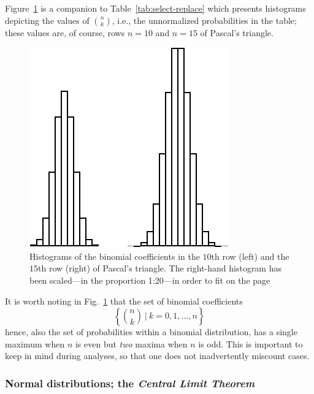 Figure~\ref{fig:gaussiandistribution} is a companion to Table~\ref{tab:select-replace} which presents histograms depicting the values of $\displaystyle {n \choose k}$, i.e., the unnormalized probabilities in the table; these values are, of course, rows $n =10$ and $n=15$ of Pascal's triangle.
\begin{figure}[htb]
\begin{center}
        \includegraphics[scale=0.45]{FiguresMaths/ProbaGaussianDistribution}
        \caption{Histograms of the binomial coefficients in the $10$th row (left) and the $15$th row (right) of Pascal's triangle.  The right-hand histogram has been scaled---in the proportion 1:20---in order to fit on the page}
        \label{fig:gaussiandistribution}
\end{center}
\end{figure}

It is worth noting in Fig.~\ref{fig:gaussiandistribution} that the set of binomial coefficients
\[ \left\{ {n \choose k} \ | \ k = 0, 1, \ldots, n \right\} \]
hence, also the set of probabilities within a binomial distribution, has a single maximum when $n$ is even but {\em two} maxima when $n$ is odd.  This is important to keep in mind during analyses, so that one does not inadvertently miscount cases.


\subsubsection{Normal distributions; the {\em Central Limit Theorem}} 
\label{sec:normal-distr}

  
 

